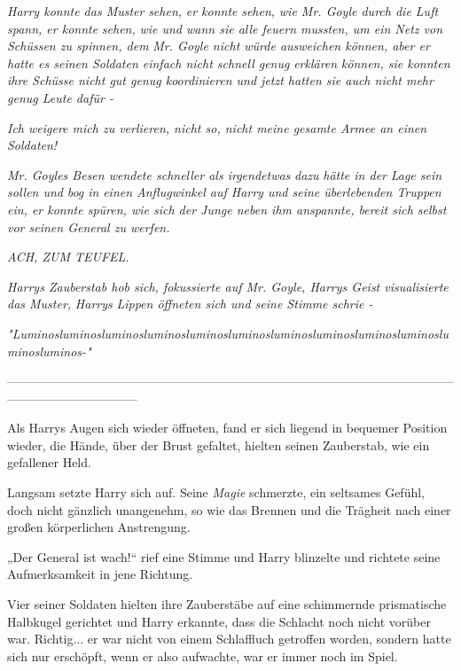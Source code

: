 {\emph{Harry konnte das Muster} \emph{\emph{sehen,}} \emph{er konnte} \emph{\emph{sehen,}} \emph{wie Mr. Goyle durch die Luft spann, er konnte} \emph{\emph{sehen,}} \emph{wie und wann sie alle feuern mussten, um ein Netz von Schüssen zu spinnen, dem} \emph{Mr. Goyle nicht würde ausweichen können, aber er hatte es seinen Soldaten einfach nicht schnell genug} \emph{\emph{erklären}} \emph{können, sie konnten ihre Schüsse nicht gut genug koordinieren und jetzt hatten sie auch nicht mehr genug Leute dafür -}

\emph{\emph{Ich weigere mich zu verlieren, nicht so, nicht meine gesamte Armee an einen Soldaten!}}

\emph{Mr. Goyles Besen wendete schneller als irgendetwas} \emph{dazu} \emph{hätte in der} \emph{Lage sein sollen und} \emph{bog in} \emph{einen Anflugwinkel auf Harry und seine überlebenden Truppen} \emph{ein, er konnte spüren, wie sich der Junge neben ihm anspannte, bereit sich selbst vor seinen General zu werfen.}

\emph{\emph{ACH, ZUM TEUFEL.}}

\emph{Harrys Zauberstab hob sich, fokussierte auf Mr. Goyle, Harrys Geist visualisierte das Muster,} \emph{Harrys} \emph{Lippen öffneten sich und seine Stimme schrie -}

\emph{"\emph{Luminosluminosluminosluminosluminosluminosluminosluminosluminosluminosluminosluminos-}"}

--------------------------------------------------------------------------------------------------------------------------------------------

\hfill\break Als Harrys Augen sich wieder öffneten, fand er sich liegend in bequemer Position wieder, die Hände, über der Brust gefaltet, hielten seinen Zauberstab, wie ein gefallener Held.

Langsam setzte Harry sich auf. Seine \emph{Magie} schmerzte, ein seltsames Gefühl, doch nicht gänzlich unangenehm, so wie das Brennen und die Trägheit nach einer großen körperlichen Anstrengung.

„Der General ist wach!“ rief eine Stimme und Harry blinzelte und richtete seine Aufmerksamkeit in jene Richtung.

Vier seiner Soldaten hielten ihre Zauberstäbe auf eine schimmernde prismatische Halbkugel gerichtet und Harry erkannte, dass die Schlacht noch nicht vorüber war. Richtig... er war nicht von einem Schlaffluch getroffen worden, sondern hatte sich nur erschöpft, wenn er also aufwachte, war er immer noch im Spiel.

}
